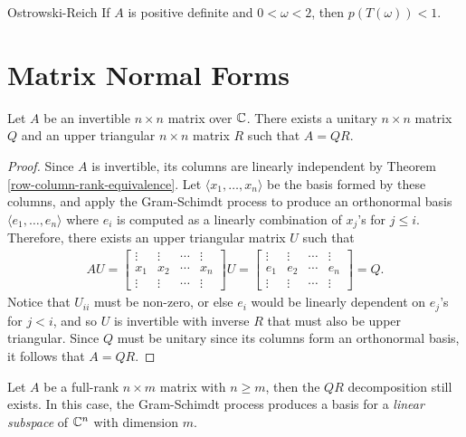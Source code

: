 \begin{thm}{Ostrowski-Reich}\label{ostrowski-reich}\proofbreak
    If $A$ is positive definite and $0 < \omega < 2$, then $p(T(\omega)) < 1$.
\end{thm}

\section{Matrix Normal Forms}

\begin{thm}
    Let $A$ be an invertible $n \times n$ matrix over $\mathbb{C}$. There exists a unitary $n \times n$ matrix $Q$ and an upper triangular $n \times n$ matrix $R$ such that $A = QR$.
\end{thm}

\begin{proof}
    Since $A$ is invertible, its columns are linearly independent by Theorem \ref{row-column-rank-equivalence}. Let $\langle x_1, \ldots, x_n \rangle$ be the basis formed by these columns, and apply the Gram-Schimdt process to produce an orthonormal basis $\langle e_1, \ldots, e_n \rangle $ where $e_i$ is computed as a linearly combination of $x_j$'s for $j \leq i$. Therefore, there exists an upper triangular matrix $U$ such that
    \begin{align*}
        AU = 
        \begin{bmatrix}
            \vdots & \vdots & \cdots & \vdots \\
            x_1 & x_2 & \cdots & x_n \\
            \vdots & \vdots & \cdots & \vdots
        \end{bmatrix}U = \begin{bmatrix}
            \vdots & \vdots & \cdots & \vdots \\
            e_1 & e_2 & \cdots & e_n \\
            \vdots & \vdots & \cdots & \vdots
        \end{bmatrix} = Q.
    \end{align*}
    Notice that $U_{ii}$ must be non-zero, or else $e_i$ would be linearly dependent on $e_j$'s for $j < i$, and so $U$ is invertible with inverse $R$ that must also be upper triangular. Since $Q$ must be unitary since its columns form an orthonormal basis, it follows that $A = QR$.
\end{proof}

\begin{rmk}
    Let $A$ be a full-rank $n \times m$ matrix with $n \geq m$, then the $QR$ decomposition still exists. In this case, the Gram-Schimdt process produces a basis for a \emph{linear subspace} of $\mathbb{C}^n$ with dimension $m$.
\end{rmk}

